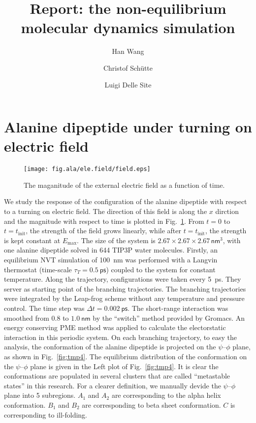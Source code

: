 \documentclass[a4paper,preprint,onecolumn]{revtex4-1}
\begin{document}
\title{Report: the non-equilibrium molecular dynamics simulation}
\author{Han Wang}
\author{Christof Sch\"utte}
\author{Luigi Delle Site}

\begin{abstract}
\end{abstract}

\maketitle

\newpage


\section{Alanine dipeptide
  under turning on electric field}
\begin{figure}
  \centering
  \texttt{[image: fig.ala/ele.field/field.eps]}
  \caption{The maganitude of the external electric field as
    a function of time.}
  \label{fig:tmp3}
\end{figure}

We study the response of the configuration of the alanine dipeptide
with respect to a turning on electric field. The direction of this
field is along the $x$ dirction and the magnitude with respect to time
is plotted in Fig.~\ref{fig:tmp3}. From $t=0$ to
$t=t_{\textrm{init}}$, the strength of the field grows linearly, while
after $t=t_{\textrm{init}}$, the strength is kept constant at
$E_{\textrm{max}}$.  The size of the system is $2.67\times 2.67\times
2.67\, \textsf{nm}^3$, with one alanine dipeptide solved in 644 TIP3P
water molecules. Firstly, an equilibrium NVT simulation of
100~\textsf{nm} was performed with a Langvin thermostat (time-scale
$\tau_T = 0.5~\textsf{ps}$) coupled to the system for constant
temperature.  Along the trajectory, configurations were taken every
5~\textsf{ps}.  They server as starting point of the branching
trajectories. The branching trajectories were integrated by the
Leap-frog scheme without any temperature and pressure control.  The
time step was $\Delta t = 0.002~\textsf{ps}$. The short-range
interaction was smoothed from $0.8$ to $1.0~\textsf{nm}$ by the
``switch'' method provided by Gromacs.  An energy conserving PME
method was applied to calculate the electorstatic interaction in this
periodic system.  On each branching trajectory, to easy the analysis,
the conformation of the alanine dipeptide is projected on the
$\psi$--$\phi$ plane, as shown in Fig.~\ref{fig:tmp4}. The equilibrium
distribution of the conformation on the $\psi$--$\phi$ plane is given
in the Left plot of Fig.~\ref{fig:tmp4}.  It is clear the
conformations are populated in several clusters that are called
``metastable states'' in this research. For a clearer definition, we
manually devide the $\psi$--$\phi$ plane into 5 subregions. $A_1$ and
$A_2$ are corresponding to the alpha helix conformation. $B_1$ and
$B_2$ are corresponding
to beta sheet conformation. $C$ is corresponding to ill-folding.\\
\end{document}
